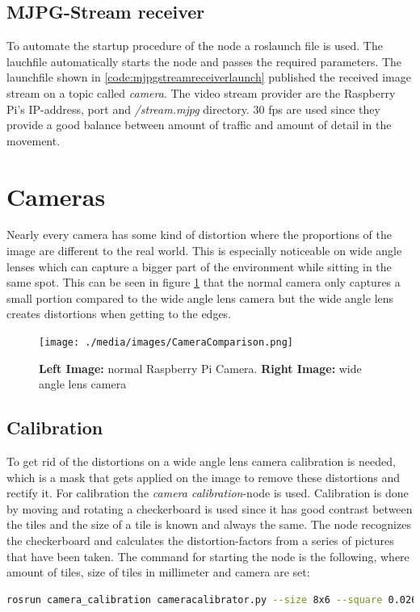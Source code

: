 \subsection{MJPG-Stream receiver}
To automate the startup procedure of the node a roslaunch file is used. The lauchfile automatically starts the node and passes the required parameters.\newline
The launchfile shown in \ref{code:mjpgstreamreceiverlaunch} published the received image stream on a topic called \textit{camera}. The video stream provider are the Raspberry Pi's IP-address, port and \textit{/stream.mjpg} directory. 30 \gls{fps} are used since they provide a good balance between amount of traffic and amount of detail in the movement.\newline



\section{Cameras\authorA}
Nearly every camera has some kind of distortion where the proportions of the image are different to the real world. This is especially noticeable on wide angle lenses which can capture a bigger part of the environment while sitting in the same spot. This can be seen in figure \ref{cameracomparison} that the normal camera only captures a small portion compared to the wide angle lens camera but the wide angle lens creates distortions when getting to the edges.\newline
\begin{figure}[h]
	\centering
	\texttt{[image: ./media/images/CameraComparison.png]}
  	\caption{\textbf{Left Image:} normal Raspberry Pi Camera. \textbf{Right Image:} wide angle lens camera}
  	\label{cameracomparison}
\end{figure}

\subsection{Calibration}
To get rid of the distortions on a wide angle lens camera calibration is needed, which is a mask that gets applied on the image to remove these distortions and rectify it.
For calibration the \textit{camera calibration}-node is used.  Calibration is done by moving and rotating a checkerboard is used since it has good contrast between the tiles and the size of a tile is known and always the same. The node recognizes the checkerboard and calculates the distortion-factors from a series of pictures that have been taken.\newline
The command for starting the node is the following, where amount of tiles, size of tiles in millimeter and camera are set:\newline
\begin{lstlisting}[language=BASH,caption={Start Calibration Node}]
rosrun camera_calibration cameracalibrator.py --size 8x6 --square 0.026 --no-service-check image:=/camera/image_raw camera:=/camera
\end{lstlisting}

